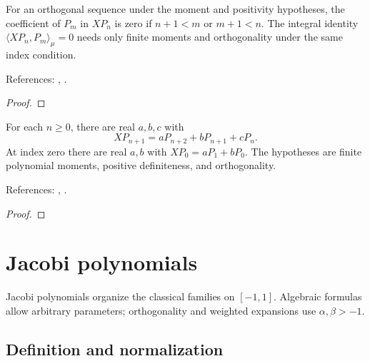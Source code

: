 \begin{supporting}
\begin{theorem}
\label{thm:general-tridiagonal}
\leanok
For an orthogonal sequence under the moment and positivity hypotheses,
the coefficient of $P_m$ in $XP_n$ is zero if $n+1<m$ or $m+1<n$.
The integral identity $\langle XP_n,P_m\rangle_\mu=0$ needs only finite moments
and orthogonality under the same index condition.

References: \cite[18.2(iv)]{dlmf}, \cite[Chapter 3]{szego}.
\end{theorem}
\begin{proof}
\leanok
\end{proof}

\begin{theorem}
\label{thm:general-three-term}
\leanok
For each $n\ge0$, there are real $a,b,c$ with
\[XP_{n+1}=aP_{n+2}+bP_{n+1}+cP_n.\]
At index zero there are real $a,b$ with $XP_0=aP_1+bP_0$.
The hypotheses are finite polynomial moments, positive definiteness, and
orthogonality.

References: \cite[18.2(iv)]{dlmf}, \cite[Chapter 3]{szego}.
\end{theorem}
\begin{proof}
\leanok
\end{proof}

\end{supporting}

\chapter{Jacobi polynomials}\label{chap:jacobi}


Jacobi polynomials organize the classical families on $[-1,1]$. Algebraic formulas allow arbitrary parameters; orthogonality and weighted expansions use $\alpha,\beta>-1$.

\section{Definition and normalization}\label{sec:textbook-jacobi-definition}

